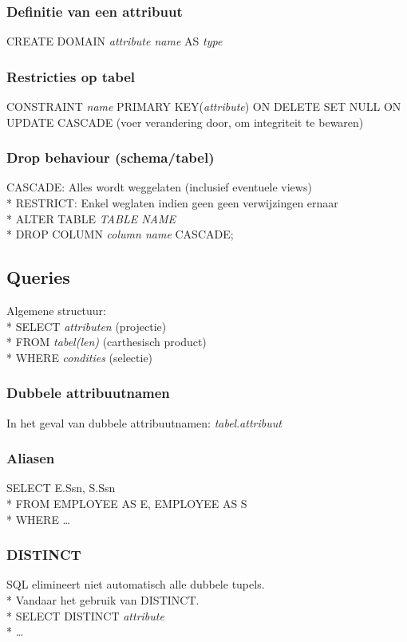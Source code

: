 \documentclass[10pt]{article}
\begin{document}
\subsubsection{Definitie van een attribuut}
CREATE DOMAIN \textit{attribute name} AS \textit{type}
\subsubsection{Restricties op tabel}
CONSTRAINT \textit{name}
PRIMARY KEY(\textit{attribute})
ON DELETE SET NULL ON UPDATE CASCADE (voer verandering door, om integriteit te bewaren)
\subsubsection{Drop behaviour (schema/tabel)}
CASCADE: Alles wordt weggelaten (inclusief eventuele views)\\*
RESTRICT: Enkel weglaten indien geen geen verwijzingen ernaar\\*
ALTER TABLE \textit{TABLE NAME}\\*
DROP COLUMN \textit{column name} CASCADE;
\subsection{Queries}
Algemene structuur:\\*
SELECT \textit{attributen} (projectie)\\*
FROM \textit{tabel(len)} (carthesisch product)\\*
WHERE \textit{condities} (selectie)
\subsubsection{Dubbele attribuutnamen}
In het geval van dubbele attribuutnamen: \textit{tabel}.\textit{attribuut}
\subsubsection{Aliasen}
SELECT E.Ssn, S.Ssn\\*
FROM EMPLOYEE AS E, EMPLOYEE AS S\\*
WHERE \dots
\subsubsection{DISTINCT}
SQL elimineert niet automatisch alle dubbele tupels.\\*
Vandaar het gebruik van DISTINCT.\\*
SELECT DISTINCT \textit{attribute}\\*
\dots
\end{document}
